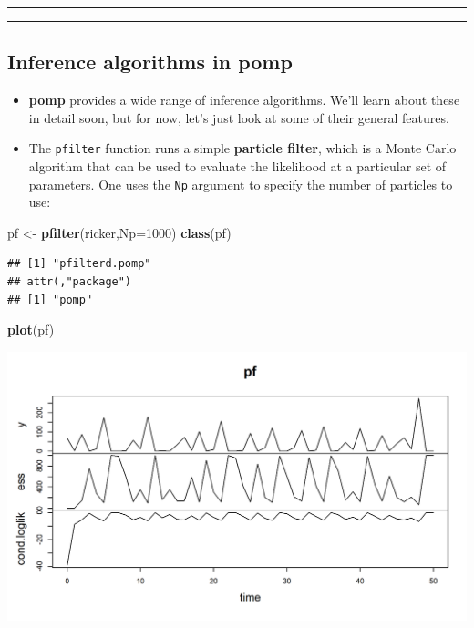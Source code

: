 \documentclass[]{article}
\newenvironment{Shaded}{\begin{snugshade}}{\end{snugshade}}
\newcommand{\KeywordTok}[1]{\textcolor[rgb]{0.13,0.29,0.53}{\textbf{#1}}}
\newcommand{\DataTypeTok}[1]{\textcolor[rgb]{0.13,0.29,0.53}{#1}}
\newcommand{\DecValTok}[1]{\textcolor[rgb]{0.00,0.00,0.81}{#1}}
\newcommand{\StringTok}[1]{\textcolor[rgb]{0.31,0.60,0.02}{#1}}
\newcommand{\NormalTok}[1]{#1}
\begin{document}
\begin{center}\rule{0.5\linewidth}{\linethickness}\end{center}

\begin{center}\rule{0.5\linewidth}{\linethickness}\end{center}

\subsection{\texorpdfstring{Inference algorithms in
\textbf{pomp}}{Inference algorithms in pomp}}\label{inference-algorithms-in-pomp}

\begin{itemize}
\item
  \textbf{pomp} provides a wide range of inference algorithms. We'll
  learn about these in detail soon, but for now, let's just look at some
  of their general features.
\item
  The \texttt{pfilter} function runs a simple \textbf{particle filter},
  which is a Monte Carlo algorithm that can be used to evaluate the
  likelihood at a particular set of parameters. One uses the \texttt{Np}
  argument to specify the number of particles to use:
\end{itemize}

\begin{Shaded}
\begin{Highlighting}[]
\NormalTok{pf <-}\StringTok{ }\KeywordTok{pfilter}\NormalTok{(ricker,}\DataTypeTok{Np=}\DecValTok{1000}\NormalTok{)}
\KeywordTok{class}\NormalTok{(pf)}
\end{Highlighting}
\end{Shaded}

\begin{verbatim}
## [1] "pfilterd.pomp"
## attr(,"package")
## [1] "pomp"
\end{verbatim}

\begin{Shaded}
\begin{Highlighting}[]
\KeywordTok{plot}\NormalTok{(pf)}
\end{Highlighting}
\end{Shaded}

\begin{center}\includegraphics{figure/intro-pfilter1-1} \end{center}
\end{document}
